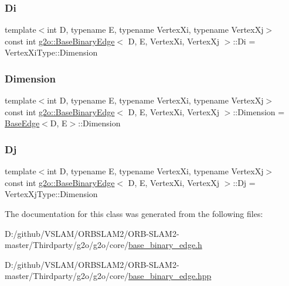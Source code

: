 \subsubsection{\texorpdfstring{Di}{Di}}
{\footnotesize\ttfamily template$<$int D, typename E, typename Vertex\+Xi, typename Vertex\+Xj$>$ \\
const int \mbox{\hyperlink{classg2o_1_1_base_binary_edge}{g2o\+::\+Base\+Binary\+Edge}}$<$ D, E, Vertex\+Xi, Vertex\+Xj $>$\+::Di = Vertex\+Xi\+Type\+::\+Dimension\hspace{0.3cm}{\ttfamily [static]}}

\mbox{\label{classg2o_1_1_base_binary_edge_af3c134948e48c446762fa4e427d1cca5}} 
\subsubsection{\texorpdfstring{Dimension}{Dimension}}
{\footnotesize\ttfamily template$<$int D, typename E, typename Vertex\+Xi, typename Vertex\+Xj$>$ \\
const int \mbox{\hyperlink{classg2o_1_1_base_binary_edge}{g2o\+::\+Base\+Binary\+Edge}}$<$ D, E, Vertex\+Xi, Vertex\+Xj $>$\+::Dimension = \mbox{\hyperlink{classg2o_1_1_base_edge}{Base\+Edge}}$<$D, E$>$\+::Dimension\hspace{0.3cm}{\ttfamily [static]}}

\mbox{\label{classg2o_1_1_base_binary_edge_ab718b94950a34d589371fe6f5583b259}} 
\subsubsection{\texorpdfstring{Dj}{Dj}}
{\footnotesize\ttfamily template$<$int D, typename E, typename Vertex\+Xi, typename Vertex\+Xj$>$ \\
const int \mbox{\hyperlink{classg2o_1_1_base_binary_edge}{g2o\+::\+Base\+Binary\+Edge}}$<$ D, E, Vertex\+Xi, Vertex\+Xj $>$\+::Dj = Vertex\+Xj\+Type\+::\+Dimension\hspace{0.3cm}{\ttfamily [static]}}



The documentation for this class was generated from the following files\+:\begin{DoxyCompactItemize}
\item 
D\+:/github/\+V\+S\+L\+A\+M/\+O\+R\+B\+S\+L\+A\+M2/\+O\+R\+B-\/\+S\+L\+A\+M2-\/master/\+Thirdparty/g2o/g2o/core/\mbox{\hyperlink{base__binary__edge_8h}{base\+\_\+binary\+\_\+edge.\+h}}\item 
D\+:/github/\+V\+S\+L\+A\+M/\+O\+R\+B\+S\+L\+A\+M2/\+O\+R\+B-\/\+S\+L\+A\+M2-\/master/\+Thirdparty/g2o/g2o/core/\mbox{\hyperlink{base__binary__edge_8hpp}{base\+\_\+binary\+\_\+edge.\+hpp}}\end{DoxyCompactItemize}
